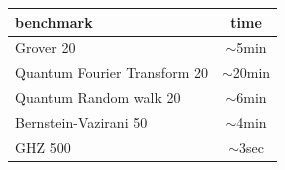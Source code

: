 \documentclass[aspectratio=1610,18pt]{ctexbeamer}
\begin{document}
\begin{frame}
  \begin{table}[]
    \Large
    \rule{0pt}{30pt}
    \begin{tabular}{l|c}
    benchmark & time \\\hline
    Grover 20       & $\sim$5min  \\
    Quantum Fourier Transform 20           & $\sim$20min \\
    Quantum Random walk 20           & $\sim$6min\\
    Bernstein-Vazirani 50           & $\sim$4min  \\
    GHZ 500         & $\sim$3sec \\
    \end{tabular}
    \end{table}
\end{frame}
\end{document}
